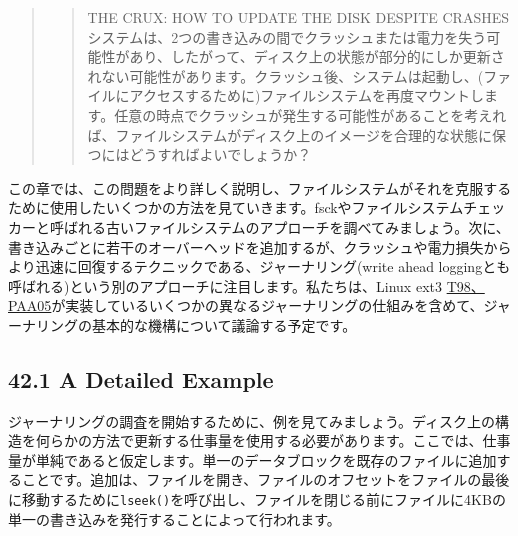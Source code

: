 \begin{quote}
\begin{quote}
THE CRUX: HOW TO UPDATE THE DISK DESPITE CRASHES\\
システムは、2つの書き込みの間でクラッシュまたは電力を失う可能性があり、したがって、ディスク上の状態が部分的にしか更新されない可能性があります。クラッシュ後、システムは起動し、(ファイルにアクセスするために)ファイルシステムを再度マウントします。任意の時点でクラッシュが発生する可能性があることを考えれば、ファイルシステムがディスク上のイメージを合理的な状態に保つにはどうすればよいでしょうか？
\end{quote}
\end{quote}

この章では、この問題をより詳しく説明し、ファイルシステムがそれを克服するために使用したいくつかの方法を見ていきます。fsckやファイルシステムチェッカーと呼ばれる古いファイルシステムのアプローチを調べてみましょう。次に、書き込みごとに若干のオーバーヘッドを追加するが、クラッシュや電力損失からより迅速に回復するテクニックである、ジャーナリング(write
ahead
loggingとも呼ばれる)という別のアプローチに注目します。私たちは、Linux
ext3
\href{比較的近代的なジャーナリングファイルシステム}{T98、PAA05}が実装しているいくつかの異なるジャーナリングの仕組みを含めて、ジャーナリングの基本的な機構について議論する予定です。

\hypertarget{a-detailed-example}{%
\subsection*{42.1 A Detailed Example}\label{a-detailed-example}}

ジャーナリングの調査を開始するために、例を見てみましょう。ディスク上の構造を何らかの方法で更新する仕事量を使用する必要があります。ここでは、仕事量が単純であると仮定します。単一のデータブロックを既存のファイルに追加することです。追加は、ファイルを開き、ファイルのオフセットをファイルの最後に移動するために\texttt{lseek()}を呼び出し、ファイルを閉じる前にファイルに4KBの単一の書き込みを発行することによって行われます。

